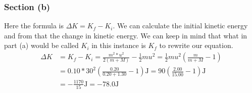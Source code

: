 \documentclass[12pt]{article}
\begin{document}
\subsubsection*{Section (b)}
Here the formula is \( \Delta K = K_f - K_i \). We can calculate the initial kinetic energy and from that the change in kinetic energy. We can keep in mind that what in part (a) would be called \(K_i\) in this instance is \(K_f\) to rewrite our equation.
\begin{align*}
    \Delta K    &=  K_f - K_i
        =   \frac{m^2*u^2}{2(m+M)} - \frac{1}{2}mu^2
        =   \frac{1}{2}mu^2\left(\frac{m}{m+M} - 1\right)\\
        &=  0.10*30^2\left(\frac{0.20}{0.20+1.30} - 1\right) \unit{\joule}
        =   90\left(\frac{2.00}{15.00} - 1\right) \unit{\joule}\\
        &=  \boxed{-\frac{1170}{15} \unit{\joule} = -78.0 \unit{\joule}}
\end{align*}
\end{document}
